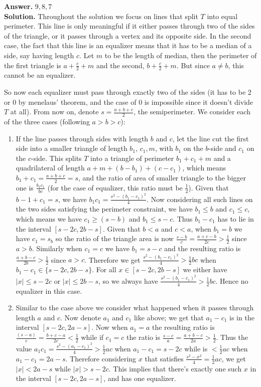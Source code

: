 \documentclass[11pt,a4paper]{article}
\newcommand{\<}{\langle}
\renewcommand{\>}{\rangle}
\begin{document}
\begin{enumerate}
\textbf{Answer.} $9, 8, 7$ \\
\textbf{Solution.} Throughout the solution we focus on lines that split $T$ into equal perimeter. This line is only meaningful if it either passes through two of the sides of the triangle, or it passes through a vertex and its opposite side. In the second case, the fact that this line is an equalizer means that it has to be a median of a side, say having length $c$. Let $m$ to be the length of median, then the perimeter of the first triangle is $a+\frac c2+m$ and the second, $b+\frac c2 + m$. But since $a\neq b$, this cannot be an equalizer. 

So now each equalizer must pass through exactly two of the sides (it has to be 2 or 0 by menelaus' theorem, and the case of 0 is impossible since it doesn't divide $T$ at all). 
From now on, denote $s=\frac{a+b+c}{2}$, the semiperimeter. 
We consider each of the three cases (following $a>b>c$):
\begin{enumerate}
	\item If the line passes through sides with length $b$ and $c$, let the line cut the first side into a smaller triangle of length $b_1$, $c_1, m$, with $b_1$ on the $b$-side and $c_1$ on the $c$-side. This splits $T$ into a triangle of perimeter $b_1+c_1+m$ and a quadrilateral of length $a+m+(b-b_1)+(c-c_1)$, which means $b_1+c_1=\frac{a+b+c}{2}=s$, and the ratio of area of smaller triangle to the bigger one is $\frac{b_1c_1}{bc}$ (for the case of equalizer, this ratio must be $\frac 12$). Given that $b-1+c_1=s$, we have $b_1c_1=\frac{s^2-(b_1-c_1)^2}{4}$. Now considering all such lines on the two sides satisfying the perimeter constraint, we have $b_1\le b$ and $c_1\le c$, which means we have $c_1\ge (s-b)$ and $b_1\le s-c$. Thus $b_1-c_1$ has to lie in the interval $[s-2c, 2b-s]$. Given that $b<a$ and $c<a$, when $b_1=b$ we have $c_1=s_b$ so the ratio of the triangle area is now $\frac{s-b}{c}=\frac{a+c-b}{2c}>\frac 12$ since $a>b$. Similarly when $c_1=c$ we have $b_1=s-c$ and the resulting ratio is $\frac{a+b-c}{2b}>\frac 12$ since $a>c$. Therefore we get $\frac{s^2-(b_1-c_1)^2}{4}>\frac 12 bc$ when $b_1-c_1\in\{s-2c, 2b-s\}$. For all $x\in [s-2c, 2b-s]$ we either have $|x|\le s-2c$ or $|x|\le 2b-s$, so we always have $\frac{s^2-(b_1-c_1)^2}{4}>\frac 12 bc$. Hence no equalizer in this case. 
	
	\item Similar to the case above we consider what happened when it passes through length $a$ and $c$. Now denote $a_1$ and $c_1$ like above; we get that $a_1-c_1$ is in the interval $[s-2c, 2a-s]$. Now when $a_1=a$ the resulting ratio is $\frac{(s-a)}{c}=\frac{b+c-a}{2c}<\frac 12$ while if $c_1=c$ the ratio is $\frac{s-c}{a}=\frac{a+b-c}{2a}>\frac 12$. Thus the value $a_1c_1=\frac{s^2-(a_1-c_1)^2}{4}>\frac 12 ac$ when $a_1-c_1=s-2c$ while is $<\frac 12 ac$ when $a_1-c_1=2a-s$. Therefore considering $x$ that satisfies $\frac{s^2-x^2}{4}=\frac 12 ac$, we get $|x|< 2a-s$ while $|x|>s-2c$. This implies that there's exactly one such $x$ in the interval $[s-2c, 2a-s]$, and has one equalizer. 
	

\end{enumerate}
\end{enumerate}
\end{document}
